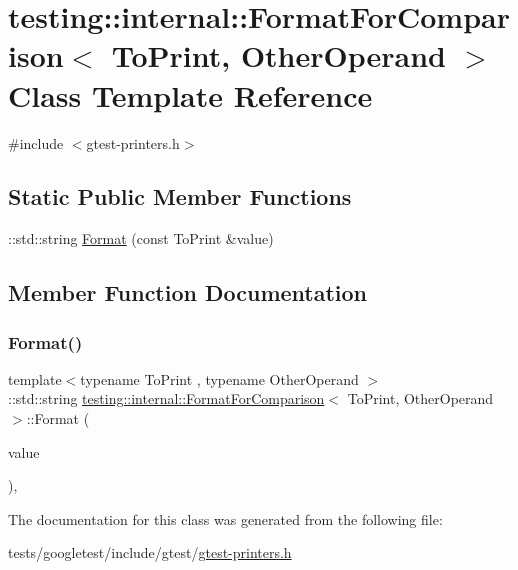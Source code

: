 \hypertarget{classtesting_1_1internal_1_1FormatForComparison}{}\section{testing\+:\+:internal\+:\+:Format\+For\+Comparison$<$ To\+Print, Other\+Operand $>$ Class Template Reference}
\label{classtesting_1_1internal_1_1FormatForComparison}


{\ttfamily \#include $<$gtest-\/printers.\+h$>$}

\subsection*{Static Public Member Functions}
\begin{DoxyCompactItemize}
\item 
\+::std\+::string \hyperlink{classtesting_1_1internal_1_1FormatForComparison_a2aeb688fc55b57abd3021d82eccad896}{Format} (const To\+Print \&value)
\end{DoxyCompactItemize}


\subsection{Member Function Documentation}
\mbox{\label{classtesting_1_1internal_1_1FormatForComparison_a2aeb688fc55b57abd3021d82eccad896}} 
\subsubsection{\texorpdfstring{Format()}{Format()}}
{\footnotesize\ttfamily template$<$typename To\+Print , typename Other\+Operand $>$ \\
\+::std\+::string \hyperlink{classtesting_1_1internal_1_1FormatForComparison}{testing\+::internal\+::\+Format\+For\+Comparison}$<$ To\+Print, Other\+Operand $>$\+::Format (\begin{DoxyParamCaption}\item[{const To\+Print \&}]{value }\end{DoxyParamCaption})\hspace{0.3cm}{\ttfamily [inline]}, {\ttfamily [static]}}



The documentation for this class was generated from the following file\+:\begin{DoxyCompactItemize}
\item 
tests/googletest/include/gtest/\hyperlink{gtest-printers_8h}{gtest-\/printers.\+h}\end{DoxyCompactItemize}
